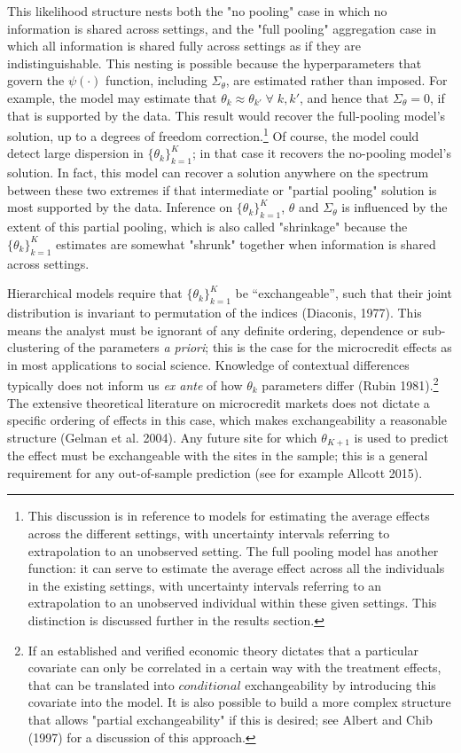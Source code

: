 \documentclass[english,12pt]{article}\usepackage{lmodern}
\numberwithin{equation}{section}
\begin{document}
This likelihood structure nests both the "no pooling" case in which no information is shared across settings, and the "full pooling" aggregation case in which all information is shared fully across settings as if they are indistinguishable. This nesting is possible because the hyperparameters that govern the $\psi(\cdot)$ function, including $\Sigma_{\theta}$, are estimated rather than imposed. For example, the model may estimate that $\theta_k \approx \theta_{k'} \; \forall \; k, k'$, and hence that $\Sigma_{\theta}= 0$, if that is supported by the data. This result would recover the full-pooling model's solution, up to a degrees of freedom correction.\footnote{This discussion is in reference to models for estimating the average effects across the different settings, with uncertainty intervals referring to extrapolation to an unobserved setting. The full pooling model has another function: it can serve to estimate the average effect across all the individuals in the existing settings, with uncertainty intervals referring to an extrapolation to an unobserved individual within these given settings. This distinction is discussed further in the results section.} Of course, the model could detect large dispersion in $  \{\theta_k\}_{k=1}^K$; in that case it recovers the no-pooling model's solution. In fact, this model can recover a solution anywhere on the spectrum between these two extremes if that intermediate or "partial pooling" solution is most supported by the data. Inference on $  \{\theta_k\}_{k=1}^K$, $\theta$ and $\Sigma_\theta$ is influenced by the extent of this partial pooling, which is also called "shrinkage" because the $  \{\theta_k\}_{k=1}^K$ estimates are somewhat "shrunk" together when information is shared across settings.

Hierarchical models require that $\{{\theta}_k\}_{k=1}^K $   be ``exchangeable'', such that their joint distribution is invariant to permutation of the indices (Diaconis, 1977). This means the analyst must be ignorant of any definite ordering, dependence or sub-clustering of the parameters \emph{a priori}; this is the case for the microcredit effects as in most applications to social science. Knowledge of contextual differences typically does not inform us \emph{ex ante} of how $\theta_k$ parameters differ (Rubin 1981).\footnote{If an established and verified economic theory dictates that a particular covariate can only be correlated in a certain way with the treatment effects, that can be translated into $conditional$ exchangeability by introducing this covariate into the model. It is also possible to build a more complex structure that allows "partial exchangeability" if this is desired; see Albert and Chib (1997) for a discussion of this approach.}  The extensive theoretical literature on microcredit markets does not dictate a specific ordering of effects in this case, which makes exchangeability a reasonable structure (Gelman et al. 2004). Any future site for which $\theta_{K+1}$ is used to predict the effect must be exchangeable with the sites in the sample; this is a general requirement for any out-of-sample prediction (see for example Allcott 2015).
\end{document}
